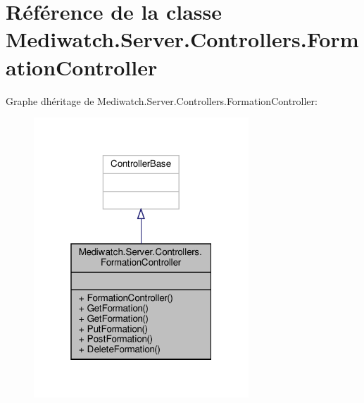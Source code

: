 \hypertarget{class_mediwatch_1_1_server_1_1_controllers_1_1_formation_controller}{}\section{Référence de la classe Mediwatch.\+Server.\+Controllers.\+Formation\+Controller}
\label{class_mediwatch_1_1_server_1_1_controllers_1_1_formation_controller}


Graphe d\textquotesingle{}héritage de Mediwatch.\+Server.\+Controllers.\+Formation\+Controller\+:\nopagebreak
\begin{figure}[H]
\begin{center}
\leavevmode
\includegraphics[width=229pt]{class_mediwatch_1_1_server_1_1_controllers_1_1_formation_controller__inherit__graph}
\end{center}
\end{figure}


